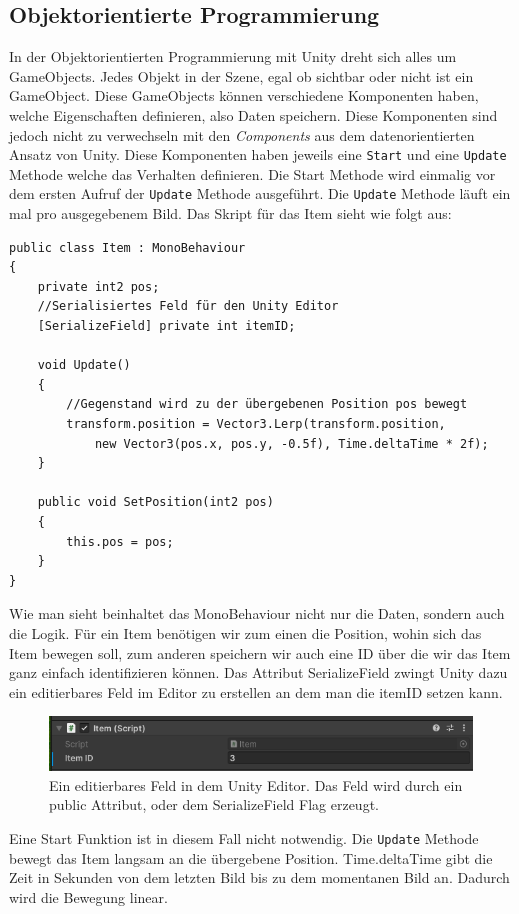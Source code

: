 \subsection{Objektorientierte Programmierung}
In der Objektorientierten Programmierung mit Unity dreht sich alles um GameObjects. Jedes Objekt in der Szene, egal ob sichtbar oder nicht ist ein GameObject. Diese GameObjects können verschiedene Komponenten haben, welche Eigenschaften definieren, also Daten speichern. Diese Komponenten sind jedoch nicht zu verwechseln mit den \textit{Components} aus dem datenorientierten Ansatz von Unity. Diese Komponenten haben jeweils eine \texttt{Start} und eine \texttt{Update} Methode welche das Verhalten definieren. Die Start Methode wird einmalig vor dem ersten Aufruf der \texttt{Update} Methode ausgeführt. Die \texttt{Update} Methode läuft ein mal pro ausgegebenem Bild. Das Skript für das Item sieht wie folgt aus:
\begin{lstlisting}[style=code, caption={Item Komponente OOP}]
public class Item : MonoBehaviour
{
    private int2 pos;
    //Serialisiertes Feld für den Unity Editor
    [SerializeField] private int itemID;

    void Update()
    {
    	//Gegenstand wird zu der übergebenen Position pos bewegt
        transform.position = Vector3.Lerp(transform.position,
            new Vector3(pos.x, pos.y, -0.5f), Time.deltaTime * 2f);
    }

    public void SetPosition(int2 pos)
    {
        this.pos = pos;
    }
}
\end{lstlisting}
Wie man sieht beinhaltet das MonoBehaviour nicht nur die Daten, sondern auch die Logik. Für ein Item benötigen wir zum einen die Position, wohin sich das Item bewegen soll, zum anderen speichern wir auch eine ID über die wir das Item ganz einfach identifizieren können. Das Attribut \glqq SerializeField\grqq{} zwingt Unity dazu ein editierbares Feld im Editor zu erstellen an dem man die itemID setzen kann.
\begin{figure}[H]
\includegraphics[scale=1]{Bilder/SerializeField.png}
\caption{Ein editierbares Feld in dem Unity Editor. Das Feld wird durch ein public Attribut, oder dem SerializeField Flag erzeugt.}
\label{fig:SerializeField}
\end{figure}
Eine Start Funktion ist in diesem Fall nicht notwendig. Die \texttt{Update} Methode bewegt das Item langsam an die übergebene Position. Time.deltaTime gibt die Zeit in Sekunden von dem letzten Bild bis zu dem momentanen Bild an. Dadurch wird die Bewegung linear.\\
